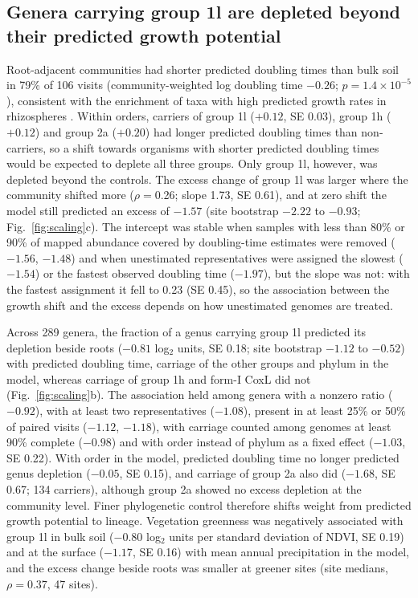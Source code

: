 \documentclass[11pt]{article}
\begin{document}
\subsection*{Genera carrying group 1l are depleted beyond their predicted growth potential}
Root-adjacent communities had shorter predicted doubling times than bulk soil in 79\% of 106 visits
(community-weighted log doubling time $-0.26$; $p=1.4\times10^{-5}$), consistent with the enrichment of
taxa with high predicted growth rates in rhizospheres \citep{lopez2023rhizosphere}. Within orders, carriers of
group 1l ($+0.12$, SE 0.03), group 1h ($+0.12$) and group 2a ($+0.20$) had longer predicted doubling times
than non-carriers, so a shift towards organisms with shorter predicted doubling times would be expected to
deplete all three groups. Only group 1l, however, was depleted beyond the controls. The excess change of
group 1l was larger where the community shifted more ($\rho=$0.26; slope 1.73, SE 0.61), and at zero shift
the model still predicted an excess of $-1.57$ (site bootstrap $-2.22$ to $-0.93$; Fig.~\ref{fig:scaling}c).
The intercept was stable when samples with less than 80\% or 90\% of mapped abundance covered by
doubling-time estimates were removed ($-1.56$, $-1.48$) and when unestimated representatives were assigned
the slowest ($-1.54$) or the fastest observed doubling time ($-1.97$), but the slope was not: with the
fastest assignment it fell to 0.23 (SE 0.45), so the association between the growth shift and the excess
depends on how unestimated genomes are treated.

Across 289 genera, the fraction of a genus carrying group 1l predicted its depletion beside roots ($-0.81$
log$_2$ units, SE 0.18; site bootstrap $-1.12$ to $-0.52$) with predicted doubling time, carriage of the
other groups and phylum in the model, whereas carriage of group 1h and form-I CoxL did not
(Fig.~\ref{fig:scaling}b). The association held among genera with a nonzero ratio ($-0.92$), with at least
two representatives ($-1.08$), present in at least 25\% or 50\% of paired visits ($-1.12$, $-1.18$), with
carriage counted among genomes at least 90\% complete ($-0.98$) and with order instead of phylum as a fixed
effect ($-1.03$, SE 0.22). With order in the model, predicted doubling time no longer predicted genus
depletion ($-0.05$, SE 0.15), and carriage of group 2a also did ($-1.68$, SE 0.67; 134 carriers), although
group 2a showed no excess depletion at the community level. Finer phylogenetic control therefore shifts
weight from predicted growth potential to lineage. Vegetation greenness was negatively associated
with group 1l in bulk soil ($-0.80$ log$_2$ units per standard deviation of NDVI, SE 0.19) and at the surface
($-1.17$, SE 0.16) with mean annual precipitation in the model, and the excess change beside roots was
smaller at greener sites (site medians, $\rho=0.37$, 47 sites).
\end{document}
